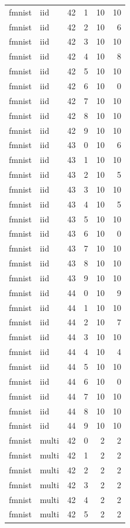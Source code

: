 \begin{tabular}{llrrrr}
fmnist & iid & 42 & 1 & 10 & 10 \\
fmnist & iid & 42 & 2 & 10 & 6 \\
fmnist & iid & 42 & 3 & 10 & 10 \\
fmnist & iid & 42 & 4 & 10 & 8 \\
fmnist & iid & 42 & 5 & 10 & 10 \\
fmnist & iid & 42 & 6 & 10 & 0 \\
fmnist & iid & 42 & 7 & 10 & 10 \\
fmnist & iid & 42 & 8 & 10 & 10 \\
fmnist & iid & 42 & 9 & 10 & 10 \\
fmnist & iid & 43 & 0 & 10 & 6 \\
fmnist & iid & 43 & 1 & 10 & 10 \\
fmnist & iid & 43 & 2 & 10 & 5 \\
fmnist & iid & 43 & 3 & 10 & 10 \\
fmnist & iid & 43 & 4 & 10 & 5 \\
fmnist & iid & 43 & 5 & 10 & 10 \\
fmnist & iid & 43 & 6 & 10 & 0 \\
fmnist & iid & 43 & 7 & 10 & 10 \\
fmnist & iid & 43 & 8 & 10 & 10 \\
fmnist & iid & 43 & 9 & 10 & 10 \\
fmnist & iid & 44 & 0 & 10 & 9 \\
fmnist & iid & 44 & 1 & 10 & 10 \\
fmnist & iid & 44 & 2 & 10 & 7 \\
fmnist & iid & 44 & 3 & 10 & 10 \\
fmnist & iid & 44 & 4 & 10 & 4 \\
fmnist & iid & 44 & 5 & 10 & 10 \\
fmnist & iid & 44 & 6 & 10 & 0 \\
fmnist & iid & 44 & 7 & 10 & 10 \\
fmnist & iid & 44 & 8 & 10 & 10 \\
fmnist & iid & 44 & 9 & 10 & 10 \\
fmnist & multi & 42 & 0 & 2 & 2 \\
fmnist & multi & 42 & 1 & 2 & 2 \\
fmnist & multi & 42 & 2 & 2 & 2 \\
fmnist & multi & 42 & 3 & 2 & 2 \\
fmnist & multi & 42 & 4 & 2 & 2 \\
fmnist & multi & 42 & 5 & 2 & 2 \\

\end{tabular}
